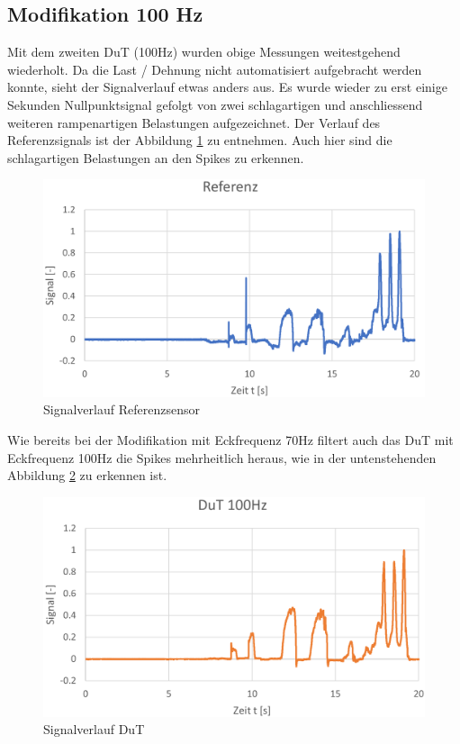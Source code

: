 	\subsection{Modifikation 100 Hz}
Mit dem zweiten DuT (100Hz) wurden obige Messungen weitestgehend wiederholt. Da die Last / Dehnung nicht automatisiert aufgebracht werden konnte, sieht der Signalverlauf etwas anders aus. Es wurde wieder zu erst einige Sekunden Nullpunktsignal gefolgt von zwei schlagartigen und anschliessend weiteren rampenartigen Belastungen aufgezeichnet. Der Verlauf des Referenzsignals ist der Abbildung \ref{fig:screenshot002} zu entnehmen. Auch hier sind die schlagartigen Belastungen an den Spikes zu erkennen.
	\begin{figure}[H]
		\centering
		\includegraphics[width=1\linewidth]{Ref_solo_100Hz}
			\caption{Signalverlauf Referenzsensor}
		\label{fig:screenshot002}
	\end{figure}
\noindent Wie bereits bei der Modifikation mit Eckfrequenz 70Hz filtert auch das DuT mit Eckfrequenz 100Hz die Spikes mehrheitlich heraus, wie in der untenstehenden Abbildung \ref{fig:dutOnly100} zu erkennen ist.
	\begin{figure}[H]
		\centering
		\includegraphics[width=1\linewidth]{Dut_solo_100Hz}
		\caption{Signalverlauf DuT}
		\label{fig:dutOnly100}
	\end{figure}
